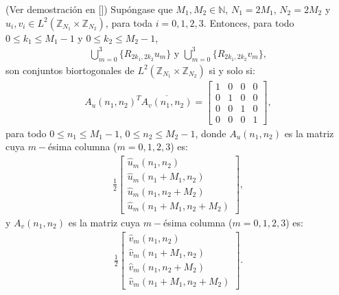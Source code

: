 \begin{theorem}
(Ver demostraci\'on en [\textcolor{cyan}{\cite{12}}]) Sup\'ongase que $M_1,M_2\in\mathbb{N}$, $N_1=2M_1$, $N_2=2M_2$ y $u_i,v_i\in L^2(\mathbb{Z}_{N_1}\times\mathbb{Z}_{N_2})$, para toda $i=0,1,2,3$. Entonces, para todo $0\leq k_1 \leq M_1-1$ y $0\leq k_2 \leq M_2-1$,
\begin{eqnarray}
\bigcup_{m=0}^{3}\{R_{2k_1,2k_2}u_m\}\mbox{ y }\bigcup_{m=0}^{3}\{R_{2k_1,2k_2}v_m\},\nonumber
\end{eqnarray}
son conjuntos biortogonales de $L^2(\mathbb{Z}_{N_1}\times\mathbb{Z}_{N_2})$ si y solo si:
\begin{eqnarray}
A_u(n_1,n_2)^T\overline{A_v(n_1,n_2)}=\left[\begin{array}{cccc}
1&0&0&0\\0&1&0&0\\0&0&1&0\\0&0&0&1
\end{array}\right],\nonumber
\end{eqnarray}
para todo $0\leq n_1 \leq M_1-1$, $0\leq n_2 \leq M_2-1$, donde $A_u(n_1,n_2)$ es la matriz cuya $m-$\'esima columna ($m=0,1,2,3$) es:
\begin{eqnarray}
\frac{1}{2}\left[\begin{array}{c}
\hat{u}_m(n_1,n_2)\\
\hat{u}_m(n_1+M_1,n_2)\\
\hat{u}_m(n_1,n_2+M_2)\\
\hat{u}_m(n_1+M_1,n_2+M_2)
\end{array}\right],\nonumber
\end{eqnarray}
y $A_v(n_1,n_2)$ es la matriz cuya $m-$\'esima columna ($m=0,1,2,3$) es:
\begin{eqnarray}
\frac{1}{2}\left[\begin{array}{c}
\hat{v}_m(n_1,n_2)\\
\hat{v}_m(n_1+M_1,n_2)\\
\hat{v}_m(n_1,n_2+M_2)\\
\hat{v}_m(n_1+M_1,n_2+M_2)
\end{array}\right].\nonumber
\end{eqnarray}
\label{biortogonalidad}
\end{theorem}

